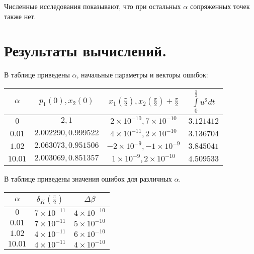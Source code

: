 \documentclass{article}
\begin{document}
Численные исследования показывают, что при остальных $\alpha$ сопряженных точек также нет.
\section{Результаты вычислений.}
В таблице приведены $\alpha$, начальные параметры и векторы ошибок:

\begin{tabular}{|c|c|c|c|}
  \hline
   $\alpha$ & $p_{1}(0), x_{2}(0)$ & $x_{1}(\frac \pi 2), x_{2}(\frac \pi 2) + \frac \pi 2$ & $\int\limits_{0}^{\frac \pi 2}u^{2}dt$\\
  \hline
    $0$ & $2, 1$ & $2\times10^{-10}, 7\times10^{-10}$ & $3.121412$\\
    $0.01$ &$2.002290, 0.999522$ &$4\times 10^{-11}, 2\times 10^{-10}$ & $3.136704$\\
    $1.02$ &$2.063073, 0.951506$ &$-2\times 10^{-9}, -1\times 10^{-9}$ & $3.845041$\\
    $10.01$ &$2.003069, 0.851357$ &$1\times 10^{-9}, 2\times 10^{-10}$ & $4.509533$\\
  \hline
\end{tabular}

В таблице приведены значения ошибок для различных $\alpha$.

\begin{tabular}{|c|c|c|}
  \hline
   $\alpha$ & $\delta_{K}(\frac \pi 2)$ & $\Delta \beta$\\
  \hline
    $0$ & $7\times 10^{-11}$ & $4\times 10^{-10}$\\
    $0.01$ & $7\times 10^{-11}$ & $5\times 10^{-10}$\\
    $1.02$ & $4\times 10^{-11}$ & $6\times 10^{-10}$\\
    $10.01$ & $4\times 10^{-11}$ & $4\times 10^{-10}$\\
  \hline
\end{tabular}
\end{document}
